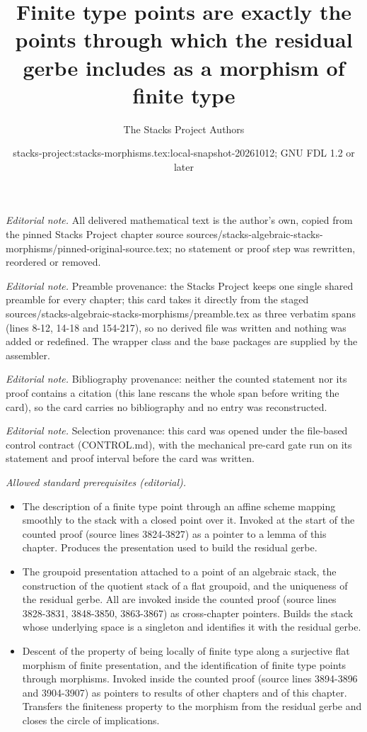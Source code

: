 \documentclass[10pt,a4paper]{amsart}
\title{Finite type points are exactly the points through which the residual gerbe includes as a morphism of finite type}
\author{The Stacks Project Authors}
\date{stacks-project:stacks-morphisms.tex:local-snapshot-20261012; GNU FDL 1.2 or later}
\theoremstyle{plain}
\theoremstyle{definition}
\theoremstyle{remark}
\numberwithin{equation}{subsection}
\begin{document}
\maketitle
\noindent\textit{Editorial note.} All delivered mathematical text is the author's own, copied from the pinned Stacks Project chapter source sources/stacks-algebraic-stacks-morphisms/pinned-original-source.tex; no statement or proof step was rewritten, reordered or removed.\par\medskip
\noindent\textit{Editorial note.} Preamble provenance: the Stacks Project keeps one single shared preamble for every chapter; this card takes it directly from the staged sources/stacks-algebraic-stacks-morphisms/preamble.tex as three verbatim spans (lines 8-12, 14-18 and 154-217), so no derived file was written and nothing was added or redefined. The wrapper class and the base packages are supplied by the assembler.\par\medskip
\noindent\textit{Editorial note.} Bibliography provenance: neither the counted statement nor its proof contains a citation (this lane rescans the whole span before writing the card), so the card carries no bibliography and no entry was reconstructed.\par\medskip
\noindent\textit{Editorial note.} Selection provenance: this card was opened under the file-based control contract (CONTROL.md), with the mechanical pre-card gate run on its statement and proof interval before the card was written.\par\medskip
\noindent\textit{Allowed standard prerequisites (editorial).}\begin{itemize}
\item The description of a finite type point through an affine scheme mapping smoothly to the stack with a closed point over it. Invoked at the start of the counted proof (source lines 3824-3827) as a pointer to a lemma of this chapter. Produces the presentation used to build the residual gerbe.
\item The groupoid presentation attached to a point of an algebraic stack, the construction of the quotient stack of a flat groupoid, and the uniqueness of the residual gerbe. All are invoked inside the counted proof (source lines 3828-3831, 3848-3850, 3863-3867) as cross-chapter pointers. Builds the stack whose underlying space is a singleton and identifies it with the residual gerbe.
\item Descent of the property of being locally of finite type along a surjective flat morphism of finite presentation, and the identification of finite type points through morphisms. Invoked inside the counted proof (source lines 3894-3896 and 3904-3907) as pointers to results of other chapters and of this chapter. Transfers the finiteness property to the morphism from the residual gerbe and closes the circle of implications.
\end{itemize}\medskip
\end{document}
